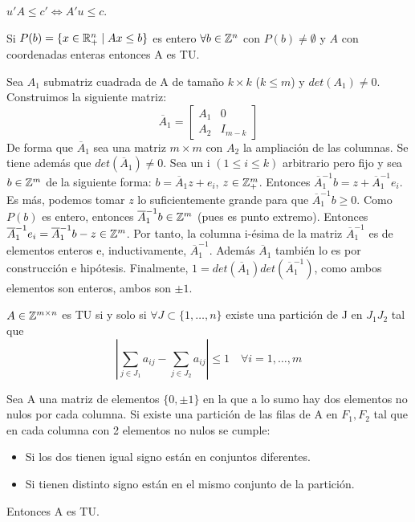 \documentclass[PM.tex]{subfiles}
\begin{document}
\begin{dem}
$u'A \leq c' \Leftrightarrow A'u \leq c$. \QED
\end{dem}
\begin{theorem}
Si $P(b)=\{x\in\mathbb{R}^n_+ \mid Ax\leq b\}$ es entero $\forall b\in\mathbb{Z}^n$ con $P(b)\neq\emptyset$ y $A$ con coordenadas enteras entonces A es TU.
\end{theorem}
\begin{dem}
Sea $A_1$ submatriz cuadrada de A de tamaño $k\times k$ ($ k \leq m$) y $det(A_1)\neq 0$. Construimos la siguiente matriz:
\[
\overline{A}_1 = 
\begin{bmatrix}
A_1 & 0\\
A_2 & I_{m-k}
\end{bmatrix}
\]
De forma que $\overline{A}_1$ sea una matriz $m\times m$ con $A_2$ la ampliación de las columnas. Se tiene además que $det(\overline{A}_1)\neq 0$. Sea un i $(1\leq i \leq k)$ arbitrario pero fijo y sea $b\in \mathbb{Z}^m$ de la siguiente forma: $b=\overline{A}_1 z + e_i$, $z\in\mathbb{Z}^m_+$. Entonces $\overline{A}_1^{-1}b=z+\overline{A}_1^{-1}e_i$. Es más, podemos tomar $z$ lo suficientemente grande para que $\overline{A}_1^{-1} b\geq 0$. Como $P(b)$ es entero, entonces $\overline{A}_1^{-1}b \in \mathbb{Z}^m$ (pues es punto extremo). Entonces $ \overline{A}_1^{-1}e_i=\overline{A}_1^{-1}b-z\in\mathbb{Z}^m$. Por tanto, la columna i-ésima de la matriz $\overline{A}_1^{-1}$ es de elementos enteros e, inductivamente, $\overline{A}_1^{-1}$. Además $\overline{A}_1$ también lo es por construcción e hipótesis. Finalmente, $1 = det(\overline{A}_1)det(\overline{A}_1^{-1})$, como ambos elementos son enteros, ambos son $\pm 1$. \QED
\end{dem}
\begin{theorem}
$A\in\mathbb{Z}^{m\times n}$ es TU si y solo si $\forall J\subset\{1,\dotsc,n\}$ existe una partición de J en $J_1J_2$ tal que 
\[
\left| \sum_{j\in J_1}a_{ij}-\sum_{j\in J_2}a_{ij} \right| \leq 1 \quad \forall i=1,\dotsc,m
\]
\end{theorem}
\begin{prop}\label{propo}
Sea A una matriz de elementos $\{0,\pm1\}$ en la que a lo sumo hay dos elementos no nulos por cada columna. Si existe una partición de las filas de A en $F_1,F_2$ tal que en cada columna con 2 elementos no nulos se cumple:
\begin{itemize}
\item Si los dos tienen igual signo están en conjuntos diferentes.
\item Si tienen distinto signo están en el mismo conjunto de la partición.
\end{itemize}
Entonces A es TU.
\end{prop}
\end{document}
